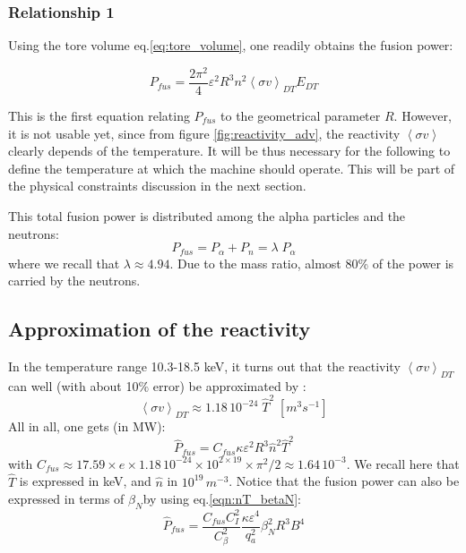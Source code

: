 \subsubsection{Relationship 1}
Using the tore volume eq.\ref{eq:tore_volume}, one readily obtains the fusion power:

\begin{equation}
	P_{fus} = \frac{2\pi^2}{4}
  				\varepsilon^2 R^3
				n^2 \left< \sigma v \right>_{DT} E_{DT}
	\label{eq:FusionPower1}
\end{equation}

This is the first equation relating $P_{fus}$ to the geometrical parameter $R$. However, it is not usable yet, since from figure \ref{fig:reactivity_adv}, the reactivity $\left< \sigma v \right>$ clearly depends of the temperature. It will be thus necessary for the following to define the temperature at which the machine should operate. This will be part of the physical constraints discussion in the next section. 


This total fusion power is distributed among the alpha particles and the neutrons: 
\begin{equation}
	P_{fus} 
	= 
	P_\alpha + P_n 
	= 
	\lambda \; P_\alpha
\label{eq:P_fus_Palpha}
\end{equation}
where we recall that $\lambda \approx 4.94$. Due to the mass ratio, almost 80\% of the power is carried by the neutrons. 

\subsection{Approximation of the reactivity}
In the temperature range 10.3-18.5 keV, it turns out that the reactivity $\left< \sigma v \right>_{DT}$ can well (with about 10$\%$ error) be approximated by \cite[(1.5.4)]{Wesson2004}: 
\begin{equation*}
  \left< \sigma v \right>_{DT} \approx 1.18\, 10^{-24}\; \hat T^2 \;\si{\left[m^3 s^{-1}\right]}
\end{equation*}
All in all, one gets (in MW):
\begin{equation}
  \hat P_{fus} = C_{fus} \kappa \varepsilon^2 R^3 \hat n^2 \hat T^2  
\label{eq:DT_fusion_power}
\end{equation}
with $C_{fus} \approx 17.59 \times e\times 1.18\, 10^{-24} \times 10^{2\times19}\times \pi^2/2 \approx 1.64\, 10^{-3}$. We recall here that $\hat T$ is expressed in keV, and $\hat n$ in $10^{19} \, \si{m^{-3}}$. 
Notice that the fusion power can also be expressed in terms of $\beta_N$by using eq.\ref{eqn:nT_betaN}:
\begin{equation}
  \hat P_{fus} = \frac{C_{fus}C_I^2}{C_\beta^2} \frac{\kappa \varepsilon^4}{q_a^2} 
    \beta_N^2 R^3 B^4 
\label{eq:DT_fusion_power_betaN}
\end{equation}



